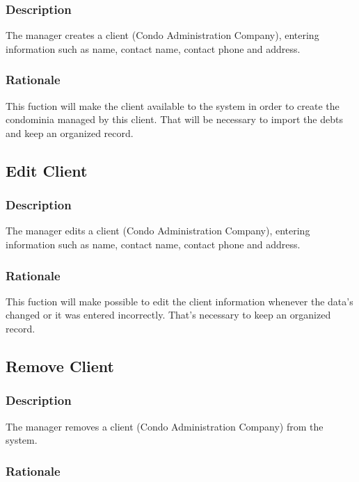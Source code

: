 \documentclass{scrreprt}
\begin{document}
\subsubsection{Description}

The manager creates a client (Condo Administration Company), entering information such as name, contact name, contact phone and address.

\subsubsection{Rationale}

This fuction will make the client available to the system in order to create the condominia managed by this client. That will be necessary to import the debts and keep an organized record.

\subsection{Edit Client}
\subsubsection{Description}

The manager edits a client (Condo Administration Company), entering information such as name, contact name, contact phone and address.

\subsubsection{Rationale}

This fuction will make possible to edit the client information whenever the data's changed or it was entered incorrectly. That's necessary to keep an organized record.

\subsection{Remove Client}
\subsubsection{Description}

The manager removes a client (Condo Administration Company) from the system.

\subsubsection{Rationale}
\end{document}
